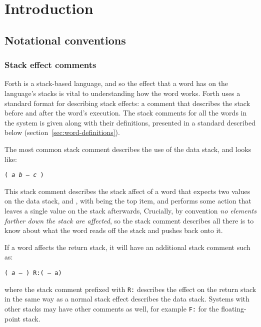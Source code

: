 
\chapter{Introduction}
\label{chap:introduction}

\section{Notational conventions}
\label{sec:conventions}

\subsection{Stack effect comments}
\label{sec:stack-comments}

Forth is a stack-based language, and so the effect that a word has on
the language's stacks is vital to understanding how the word
works. Forth uses a standard format for describing stack effects: a
comment that describes the stack before and after the word's
execution. The stack comments for all the words in the system is given
along with their definitions, presented in a standard described below
(section~\ref{sec:word-definitions}).

The most common stack comment describes the use of the data stack, and
looks like:

\begin{center}
  \texttt{( \textit{a b -- c} )}
\end{center}

\noindent This stack comment describes the stack affect of a word that
expects two values on the data stack,  and , with
 being the top item, and performs some action that leaves a
single value  on the stack afterwards, Crucially, by convention
\emph{no elements farther down the stack are affected}, so the stack
comment describes all there is to know about what the word reads off
the stack and pushes back onto it.

If a word affects the return stack, it will have an additional stack
comment such as:

\begin{center}
  \texttt{( \textit{a --} ) R:( -- a)}
\end{center}

\noindent where the stack comment prefixed with \texttt{R:} describes
the effect on the return stack in the same way as a normal stack
effect describes the data stack. Systems with other stacks may have
other comments as well, for example \texttt{F:} for the floating-point
stack.

